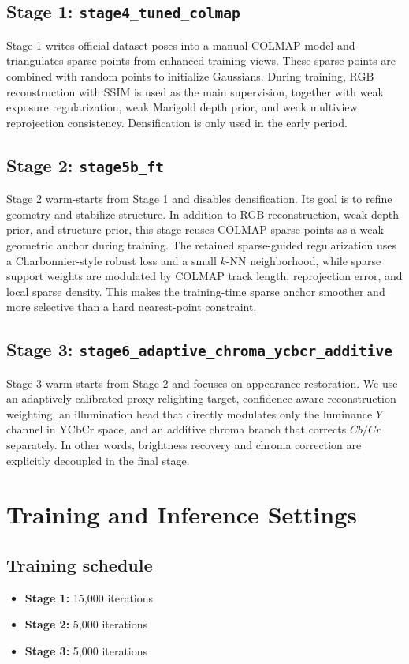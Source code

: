 \documentclass[10pt,a4paper]{article}
\begin{document}
\subsection{Stage 1: \texttt{stage4\_tuned\_colmap}}
Stage 1 writes official dataset poses into a manual COLMAP model and triangulates sparse points from enhanced training views. These sparse points are combined with random points to initialize Gaussians. During training, RGB reconstruction with SSIM is used as the main supervision, together with weak exposure regularization, weak Marigold depth prior, and weak multiview reprojection consistency. Densification is only used in the early period.

\subsection{Stage 2: \texttt{stage5b\_ft}}
Stage 2 warm-starts from Stage 1 and disables densification. Its goal is to refine geometry and stabilize structure. In addition to RGB reconstruction, weak depth prior, and structure prior, this stage reuses COLMAP sparse points as a weak geometric anchor during training. The retained sparse-guided regularization uses a Charbonnier-style robust loss and a small $k$-NN neighborhood, while sparse support weights are modulated by COLMAP track length, reprojection error, and local sparse density. This makes the training-time sparse anchor smoother and more selective than a hard nearest-point constraint.

\subsection{Stage 3: \texttt{stage6\_adaptive\_chroma\_ycbcr\_additive}}
Stage 3 warm-starts from Stage 2 and focuses on appearance restoration. We use an adaptively calibrated proxy relighting target, confidence-aware reconstruction weighting, an illumination head that directly modulates only the luminance $Y$ channel in YCbCr space, and an additive chroma branch that corrects $Cb/Cr$ separately. In other words, brightness recovery and chroma correction are explicitly decoupled in the final stage.

\section{Training and Inference Settings}
\subsection{Training schedule}
\begin{itemize}[leftmargin=2em]
  \item \textbf{Stage 1:} 15{,}000 iterations
  \item \textbf{Stage 2:} 5{,}000 iterations
  \item \textbf{Stage 3:} 5{,}000 iterations
\end{itemize}
\end{document}
